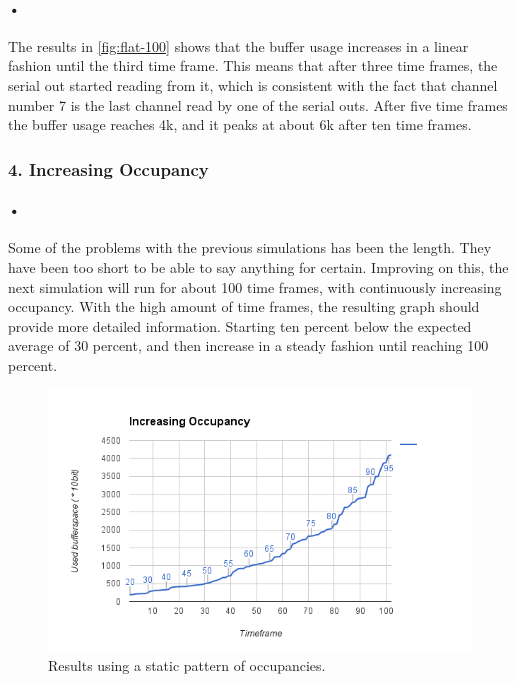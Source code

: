 \documentclass[a4paper, 12pt]{report}\dfrac{\right }{•}
\begin{document}
\paragraph{•} %
The results in \ref{fig:flat-100} shows that the buffer usage increases in a linear fashion until the third time frame.
This means that after three time frames, the serial out started reading from it, which is consistent with the fact that channel number 7 is the last channel read by one of the serial outs.
After five time frames the buffer usage reaches 4k, and it peaks at about 6k after ten time frames.

\subsubsection{4. Increasing Occupancy}

\paragraph{•} %
Some of the problems with the previous simulations has been the length.
They have been too short to be able to say anything for certain.
Improving on this, the next simulation will run for about 100 time frames, with continuously increasing occupancy.
With the high amount of time frames, the resulting graph should provide more detailed information.
Starting ten percent below the expected average of 30 percent, and then increase in a steady fashion until reaching 100 percent.

\begin{figure}[h!]
	\centering
		\includegraphics[width=1.0\textwidth]{images/increasing-occ.png}
		\caption{Results using a static pattern of occupancies.}
		\label{fig:increasing-occ}
\end{figure}
\end{document}
